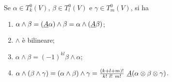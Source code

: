 \begin{proposition} \label{prop:ProprietaWedge}
	Se $\alpha \in T^0_k(V)$, $\beta \in T^0_l(V)$ e $\gamma \in T^0_m(V)$, si ha
	\begin{enumerate}
		\item $\alpha\wedge\beta = (\underline{A} \alpha) \wedge \beta = \alpha\wedge (\underline{A} \beta)$; \label{pw:Antisimmetrica}
		\item $\wedge$ è bilineare; \label{pw:Bilineare}
		\item $\alpha\wedge \beta = (-1)^{kl} \beta \wedge \alpha$; \label{pw:Anticommutativa}
		\item $\alpha\wedge(\beta\wedge \gamma) = (\alpha\wedge\beta)\wedge\gamma = \frac{(k+l+m)!}{k!\ l!\ m!}\ \antisimm(\alpha\otimes\beta\otimes\gamma)$. \label{pw:Associativa}
	\end{enumerate}
\end{proposition}
